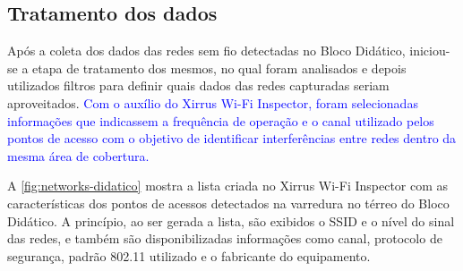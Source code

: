 \begin{figure}[H]
	\centering
\end{figure}

\subsection{Tratamento dos dados}
\label{subsec:tratamento-dos-dados}

Após a coleta dos dados das redes sem fio detectadas no Bloco Didático, iniciou-se a etapa de tratamento dos mesmos, no qual foram analisados e depois utilizados filtros para definir quais dados das redes capturadas seriam aproveitados. \textcolor{blue}{Com o auxílio do Xirrus Wi-Fi Inspector, foram selecionadas informações que indicassem a frequência de operação e o canal utilizado pelos pontos de acesso com o objetivo de identificar interferências entre redes dentro da mesma área de cobertura.}

A \autoref{fig:networks-didatico} mostra a lista criada no Xirrus Wi-Fi Inspector com as características dos pontos de acessos detectados na varredura no térreo do Bloco Didático. A princípio, ao ser gerada a lista, são exibidos o SSID e o nível do sinal das redes, e também são disponibilizadas informações como canal, protocolo de segurança, padrão 802.11 utilizado e o fabricante do equipamento.

\begin{figure}[H]
	\centering
\end{figure}

